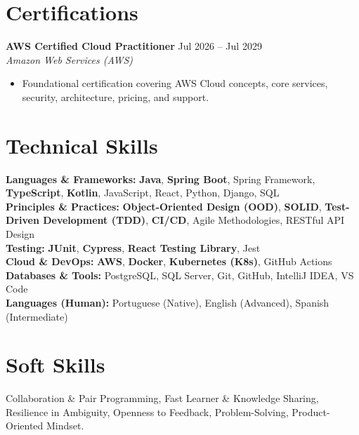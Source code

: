 \documentclass[a4paper,10pt]{article}
\newcommand{\entry}[4]{
    \noindent\textbf{#1} \hfill #2 \\
    \noindent\textit{#3} \hfill \textit{#4} \\
    \vspace{2pt}
}
\begin{document}
\section*{Certifications}
\vspace{0.6em}

\entry{AWS Certified Cloud Practitioner}{\faCalendar \space Jul 2026 -- Jul 2029}{Amazon Web Services (AWS)}{}
\vspace{-1.6em}
\begin{itemize}
\setlength\itemsep{-0.3em}
    \item Foundational certification covering AWS Cloud concepts, core services, security, architecture, pricing, and support.
\end{itemize}

\section*{Technical Skills}
\vspace{0.6em}
\noindent \textbf{Languages \& Frameworks:} \textbf{Java}, \textbf{Spring Boot}, Spring Framework, \textbf{TypeScript}, \textbf{Kotlin}, JavaScript, React, Python, Django, SQL \\
\noindent \textbf{Principles \& Practices:} \textbf{Object-Oriented Design (OOD)}, \textbf{SOLID}, \textbf{Test-Driven Development (TDD)}, \textbf{CI/CD}, Agile Methodologies, RESTful API Design \\
\noindent \textbf{Testing:} \textbf{JUnit}, \textbf{Cypress}, \textbf{React Testing Library}, Jest \\
\noindent \textbf{Cloud \& DevOps:} \textbf{AWS}, \textbf{Docker}, \textbf{Kubernetes (K8s)}, GitHub Actions \\
\noindent \textbf{Databases \& Tools:} PostgreSQL, SQL Server, Git, GitHub, IntelliJ IDEA, VS Code \\
\noindent \textbf{Languages (Human):} Portuguese (Native), English (Advanced), Spanish (Intermediate)

\section*{Soft Skills}
\vspace{0.6em}
\noindent Collaboration \& Pair Programming, Fast Learner \& Knowledge Sharing, Resilience in Ambiguity, Openness to Feedback, Problem-Solving, Product-Oriented Mindset.
\end{document}
